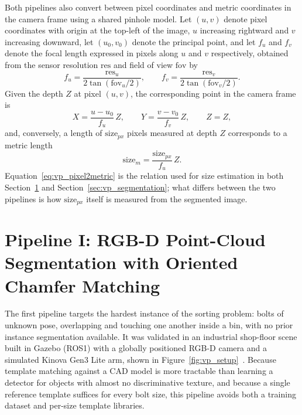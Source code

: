 Both pipelines also convert between pixel coordinates and metric coordinates in the camera frame
using a shared pinhole model. Let $(u,v)$ denote pixel coordinates with origin at the top-left of
the image, $u$ increasing rightward and $v$ increasing downward, let $(u_0, v_0)$ denote the
principal point, and let $f_u$ and $f_v$ denote the focal length expressed in pixels along $u$ and
$v$ respectively, obtained from the sensor resolution $\mathrm{res}$ and field of view
$\mathrm{fov}$ by
\begin{equation}
f_u = \frac{\mathrm{res}_u}{2\tan(\mathrm{fov}_u/2)}, \qquad
f_v = \frac{\mathrm{res}_v}{2\tan(\mathrm{fov}_v/2)}.
\label{eq:vp_focal}
\end{equation}
Given the depth $Z$ at pixel $(u,v)$, the corresponding point in the camera frame is
\begin{equation}
X = \frac{u - u_0}{f_u}\,Z, \qquad Y = \frac{v - v_0}{f_v}\,Z, \qquad Z = Z,
\label{eq:vp_backproject}
\end{equation}
and, conversely, a length of $\mathrm{size}_{px}$ pixels measured at depth $Z$ corresponds to a
metric length
\begin{equation}
\mathrm{size}_{m} = \frac{\mathrm{size}_{px}}{f_u}\,Z.
\label{eq:vp_pixel2metric}
\end{equation}
Equation~\eqref{eq:vp_pixel2metric} is the relation used for size estimation in both
Section~\ref{sec:vp_template} and Section~\ref{sec:vp_segmentation}; what differs between the two
pipelines is how $\mathrm{size}_{px}$ itself is measured from the segmented image.

\section{Pipeline I: RGB-D Point-Cloud Segmentation with Oriented Chamfer Matching}\label{sec:vp_template}

The first pipeline targets the hardest instance of the sorting problem: bolts of unknown pose,
overlapping and touching one another inside a bin, with no prior instance segmentation available.
It was validated in an industrial shop-floor scene built in Gazebo (ROS1) with a globally
positioned RGB-D camera and a simulated Kinova Gen3 Lite arm, shown in
Figure~\ref{fig:vp_setup}~\citep{sk2024bolthandling}. Because template matching against a CAD
model is more tractable than learning a detector for objects with almost no discriminative
texture, and because a single reference template suffices for every bolt size, this pipeline
avoids both a training dataset and per-size template libraries.

